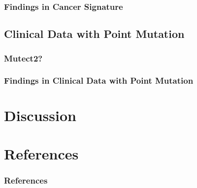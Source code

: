 \documentclass{beamer}
\begin{document}
    \begin{frame}
        \frametitle{Findings in Cancer Signature}
    \end{frame}

    \subsection{Clinical Data with Point Mutation}
    \begin{frame}
        \frametitle{Mutect2?}
    \end{frame}

    \begin{frame}
        \frametitle{Findings in Clinical Data with Point Mutation}
    \end{frame}

    \section{Discussion}

    \section{References}
    \begin{frame}[allowframebreaks]
        \frametitle{References}
        
        
    \end{frame}
\end{document}
